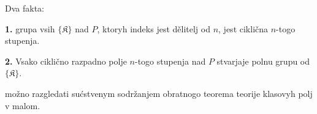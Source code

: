 \documentclass[11pt]{article}
\begin{document}
Dva fakta:

\noindent\textbf{1.} grupa vsih \(\{\mathfrak K\}\) nad \(P\), ktoryh indeks jest dělitelj od \(n\), jest ciklična \(n\)-togo stupenja.

\noindent\textbf{2.} Vsako ciklično razpadno polje \(n\)-togo stupenja nad \(P\) stvarjaje polnu grupu od \(\{\mathfrak K\}\).

možno razgledati sućstvenym sodržanjem obratnogo teorema teorije klasovyh polj v malom.


\clearpage
\end{document}
